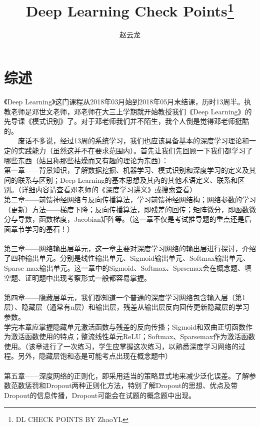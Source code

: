 \documentclass[UFT8]{ctexart}
\author{赵云龙}
\title{Deep Learning Check Points\footnote{DL CHECK POINTS BY ZhaoYL}}
\begin{document}
\maketitle
\tableofcontents  \newpage
\section{综述} 
	《Deep Learning》这门课程从2018年03月始到2018年05月末结课，历时13周半。执教老师是邓世文老师，邓老师在大三上学期就开始教授我们《Deep Learning》的先导课《模式识别》了。对于邓老师我们并不陌生，我个人倒是觉得邓老师挺酷的。\newline
~\\
$\qquad $废话不多说，经过13周的系统学习，我们也应该具备基本的深度学习理论和一定的实践能力（虽然这并不在要求范围内）。首先让我们先回顾一下我们都学习了哪些东西（姑且称那些枯燥而又有趣的理论为东西）：\newline
~\\
\qquad 第一章——背景知识，了解数据挖掘、机器学习、模式识别和深度学习的定义及其间的联系与区别；Deep Learning的基本思想及其內的其他术语定义、联系和区别。（详细内容请查看邓老师的《深度学习讲义》或搜索查看）\newline
~\\
\qquad 第二章——前馈神经网络与反向传播算法，学习前馈神经网结构；网络参数的学习（更新）方法——梯度下降；反向传播算法，即残差的回传；矩阵微分，即函数微分与导数，函数梯度，Jacobian矩阵等。（这一章不仅是考试推导题的重点还是后面章节学习的基石！）\\
~\\
\qquad 第三章——网络输出层单元，这一章主要对深度学习网络的输出层进行探讨，介绍了四种输出单元。分别是线性输出单元、Sigmoid输出单元、Softmax输出单元、Sparse max输出单元。这一章中的Sigmoid、Softmax、Sprsemax会在概念题、填空题、证明题中出现考察形式一般都容易掌握。\\
~\\
\qquad 第四章——隐藏层单元，我们都知道一个普通的深度学习网络包含输入层（第1层）、隐藏层（通常有n层）和输出层，残差从输出层反向回传更新隐藏层的学习参数。\\
学完本章应掌握隐藏单元激活函数与残差的反向传播；Sigmoid和双曲正切函数作为激活函数使用的特点；整流线性单元ReLU；Softmax、Sparsemax作为激活函数使用。（该章进行了一次练习，学生应掌握这次练习，以熟悉深度学习网络的过程。另外，隐藏层饱和态是可能考点出现在概念题中）\\
~\\
\qquad 第五章——深度网络的正则化，即采用适当的策略显式地来减少泛化误差。了解参数范数惩罚和Dropout两种正则化方法，特别了解Dropout的思想、优点及带Dropout的信息传播，Dropout可能会在试题的概念题中出现。\\
\end{document}
